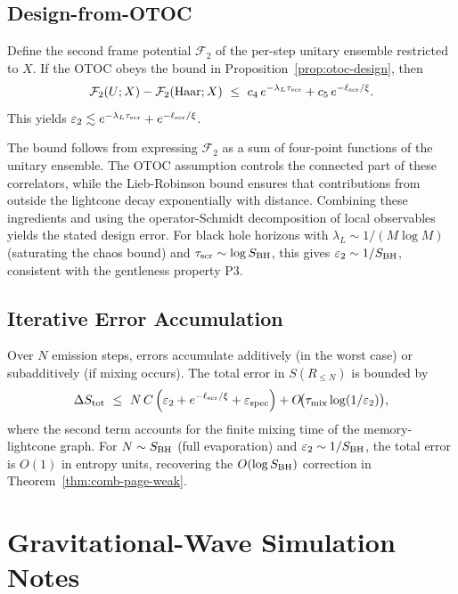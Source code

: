 \documentclass[aps,prd,preprint,onecolumn,superscriptaddress,nofootinbib,longbibliography,floatfix,11pt,showpacs,showkeys]{revtex4-2}
\theoremstyle{plain}
\theoremstyle{definition}
\theoremstyle{remark}
\begin{document}
\subsection{Design-from-OTOC}
Define the second frame potential $\mathcal{F}_2$ of the per-step unitary ensemble restricted to $X$. If the OTOC obeys the bound in Proposition~\ref{prop:otoc-design}, then
\begin{equation}
\mathcal{F}_2(U;X) - \mathcal{F}_2(\text{Haar};X) \ \le\ c_4\, e^{-\lambda_L \tau_{\rm scr}} + c_5\, e^{-\ell_{\rm scr}/\xi}.
\end{equation}
This yields $\varepsilon_2 \lesssim e^{-\lambda_L \tau_{\rm scr}} + e^{-\ell_{\rm scr}/\xi}$.

The bound follows from expressing $\mathcal{F}_2$ as a sum of four-point functions of the unitary ensemble. The OTOC assumption controls the connected part of these correlators, while the Lieb-Robinson bound ensures that contributions from outside the lightcone decay exponentially with distance. Combining these ingredients and using the operator-Schmidt decomposition of local observables yields the stated design error. For black hole horizons with $\lambda_L \sim 1/(M \log M)$ (saturating the chaos bound) and $\tau_{\rm scr} \sim \log S_{\rm BH}$, this gives $\varepsilon_2 \sim 1/S_{\rm BH}$, consistent with the gentleness property P3.

\subsection{Iterative Error Accumulation}
Over $N$ emission steps, errors accumulate additively (in the worst case) or subadditively (if mixing occurs). The total error in $S(R_{\le N})$ is bounded by
\begin{equation}
\Delta S_{\rm tot} \ \le\ N\, C\left(\varepsilon_2 + e^{-\ell_{\rm scr}/\xi} + \varepsilon_{\rm spec}\right) + O\!\big(\tau_{\rm mix} \log(1/\varepsilon_2)\big),
\end{equation}
where the second term accounts for the finite mixing time of the memory-lightcone graph. For $N \sim S_{\rm BH}$ (full evaporation) and $\varepsilon_2 \sim 1/S_{\rm BH}$, the total error is $O(1)$ in entropy units, recovering the $O(\log S_{\rm BH})$ correction in Theorem~\ref{thm:comb-page-weak}.


\section{Gravitational-Wave Simulation Notes}
\end{document}
